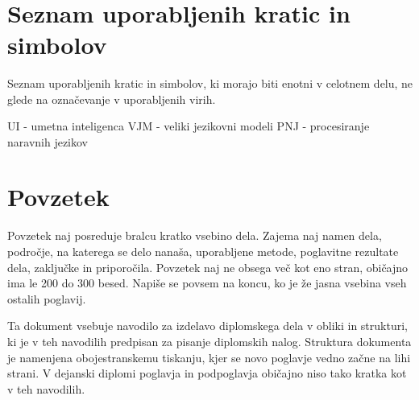 \documentclass[12pt,a4paper]{book}
\begin{document}
\newpage


\ \thispagestyle{empty}

\newpage


\renewcommand\thepage{} 
\tableofcontents 
\renewcommand\thepage{\arabic{page}}

\thispagestyle{empty}



\chapter*{Seznam uporabljenih kratic in simbolov}

\thispagestyle{empty}

Seznam uporabljenih kratic in simbolov, ki morajo biti enotni v celotnem delu, ne glede na označevanje v uporabljenih virih.

UI - umetna inteligenca
VJM - veliki jezikovni modeli
PNJ - procesiranje naravnih jezikov


\clearpage{\pagestyle{empty}\cleardoublepage}


\setcounter{page}{1}

\chapter*{Povzetek}

Povzetek naj posreduje bralcu kratko vsebino dela. Zajema naj namen dela, področje, na katerega se delo nanaša,
uporabljene metode, poglavitne rezultate dela, zaključke in priporočila. 
Povzetek naj ne obsega več kot eno stran, obi\v cajno ima le 200 do 300 besed. Napiše se povsem na koncu,
ko je že jasna vsebina vseh ostalih poglavij.

Ta dokument vsebuje navodilo za izdelavo diplomskega dela v obliki in strukturi, ki je v teh navodilih predpisan za
pisanje diplomskih nalog. Struktura dokumenta je namenjena obojestranskemu tiskanju, kjer se novo poglavje vedno za\v cne na lihi strani.
V dejanski diplomi poglavja in podpogla\-vja  obi\v cajno niso tako kratka kot v teh navodilih.
\end{document}
